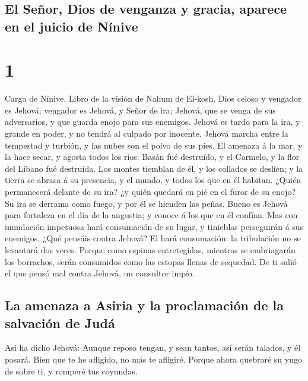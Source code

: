 \hypertarget{el-seuxf1or-dios-de-venganza-y-gracia-aparece-en-el-juicio-de-nuxednive}{%
\subsection{El Señor, Dios de venganza y gracia, aparece en el juicio de
Nínive}\label{el-seuxf1or-dios-de-venganza-y-gracia-aparece-en-el-juicio-de-nuxednive}}

\hypertarget{section}{%
\section{1}\label{section}}

 Carga de Nínive. Libro de la visión de Nahum de El-kosh.
 Dios celoso y vengador es Jehová; vengador es Jehová, y
Señor de ira; Jehová, que se venga de sus adversarios, y que guarda
enojo para sus enemigos.  Jehová es tardo para la ira, y
grande en poder, y no tendrá al culpado por inocente. Jehová marcha
entre la tempestad y turbión, y las nubes son el polvo de sus pies.
 El amenaza á la mar, y la hace secar, y agosta todos los
ríos: Basán fué destruído, y el Carmelo, y la flor del Líbano fué
destruída.  Los montes tiemblan de él, y los collados se
deslíen; y la tierra se abrasa á su presencia, y el mundo, y todos los
que en él habitan.  ¿Quién permanecerá delante de su ira? ¿y
quién quedará en pié en el furor de su enojo? Su ira se derrama como
fuego, y por él se hienden las peñas.  Bueno es Jehová para
fortaleza en el día de la angustia; y conoce á los que en él confían.
 Mas con inundación impetuosa hará consumación de su lugar,
y tinieblas perseguirán á sus enemigos.  ¿Qué pensáis contra
Jehová? El hará consumación: la tribulación no se levantará dos veces.
 Porque como espinas entretegidas, mientras se embriagarán
los borrachos, serán consumidos como las estopas llenas de sequedad.
 De ti salió el que pensó mal contra Jehová, un consultor
impío.

\hypertarget{la-amenaza-a-asiria-y-la-proclamaciuxf3n-de-la-salvaciuxf3n-de-juduxe1}{%
\subsection{La amenaza a Asiria y la proclamación de la salvación de
Judá}\label{la-amenaza-a-asiria-y-la-proclamaciuxf3n-de-la-salvaciuxf3n-de-juduxe1}}

 Así ha dicho Jehová: Aunque reposo tengan, y sean tantos,
así serán talados, y él pasará. Bien que te he afligido, no más te
afligiré.  Porque ahora quebraré su yugo de sobre ti, y
romperé tus coyundas.


